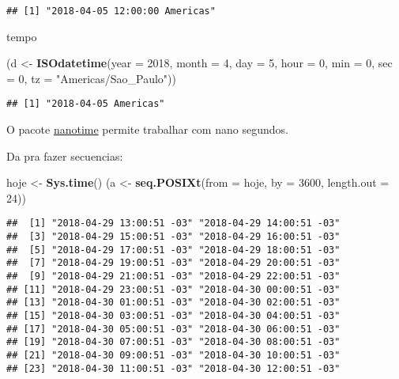 \documentclass[]{book}
\newenvironment{Shaded}{\begin{snugshade}}{\end{snugshade}}
\newcommand{\KeywordTok}[1]{\textcolor[rgb]{0.13,0.29,0.53}{\textbf{#1}}}
\newcommand{\DataTypeTok}[1]{\textcolor[rgb]{0.13,0.29,0.53}{#1}}
\newcommand{\DecValTok}[1]{\textcolor[rgb]{0.00,0.00,0.81}{#1}}
\newcommand{\StringTok}[1]{\textcolor[rgb]{0.31,0.60,0.02}{#1}}
\newcommand{\NormalTok}[1]{#1}
\theoremstyle{definition}
\theoremstyle{definition}
\theoremstyle{definition}
\theoremstyle{remark}
\begin{document}
\begin{verbatim}
## [1] "2018-04-05 12:00:00 Americas"
\end{verbatim}

tempo

\begin{Shaded}
\begin{Highlighting}[]
\NormalTok{(d <-}\StringTok{ }\KeywordTok{ISOdatetime}\NormalTok{(}\DataTypeTok{year =} \DecValTok{2018}\NormalTok{, }\DataTypeTok{month =} \DecValTok{4}\NormalTok{, }\DataTypeTok{day =} \DecValTok{5}\NormalTok{, }\DataTypeTok{hour =} \DecValTok{0}\NormalTok{, }\DataTypeTok{min =} \DecValTok{0}\NormalTok{, }\DataTypeTok{sec =} \DecValTok{0}\NormalTok{,}
                  \DataTypeTok{tz =} \StringTok{"Americas/Sao_Paulo"}\NormalTok{))}
\end{Highlighting}
\end{Shaded}

\begin{verbatim}
## [1] "2018-04-05 Americas"
\end{verbatim}

O pacote \href{https://github.com/eddelbuettel/nanotime}{nanotime}
permite trabalhar com nano segundos.

Da pra fazer secuencias:

\begin{Shaded}
\begin{Highlighting}[]
\NormalTok{hoje <-}\StringTok{ }\KeywordTok{Sys.time}\NormalTok{()}
\NormalTok{(a <-}\StringTok{ }\KeywordTok{seq.POSIXt}\NormalTok{(}\DataTypeTok{from =}\NormalTok{ hoje, }\DataTypeTok{by =} \DecValTok{3600}\NormalTok{, }\DataTypeTok{length.out =} \DecValTok{24}\NormalTok{))}
\end{Highlighting}
\end{Shaded}

\begin{verbatim}
##  [1] "2018-04-29 13:00:51 -03" "2018-04-29 14:00:51 -03"
##  [3] "2018-04-29 15:00:51 -03" "2018-04-29 16:00:51 -03"
##  [5] "2018-04-29 17:00:51 -03" "2018-04-29 18:00:51 -03"
##  [7] "2018-04-29 19:00:51 -03" "2018-04-29 20:00:51 -03"
##  [9] "2018-04-29 21:00:51 -03" "2018-04-29 22:00:51 -03"
## [11] "2018-04-29 23:00:51 -03" "2018-04-30 00:00:51 -03"
## [13] "2018-04-30 01:00:51 -03" "2018-04-30 02:00:51 -03"
## [15] "2018-04-30 03:00:51 -03" "2018-04-30 04:00:51 -03"
## [17] "2018-04-30 05:00:51 -03" "2018-04-30 06:00:51 -03"
## [19] "2018-04-30 07:00:51 -03" "2018-04-30 08:00:51 -03"
## [21] "2018-04-30 09:00:51 -03" "2018-04-30 10:00:51 -03"
## [23] "2018-04-30 11:00:51 -03" "2018-04-30 12:00:51 -03"
\end{verbatim}
\end{document}

